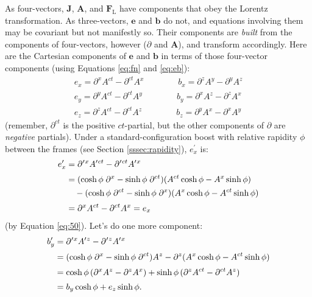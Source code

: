 \documentclass[12pt]{article}
\renewcommand{\vv}[1]{\mathbf{#1}}
\begin{document}
As four-vectors, $\vv J$, $\vv A$, and $\vv F_{\mathrm{L}}$ have components that obey the Lorentz transformation. As three-vectors, $\vv e$ and $\vv b$ do not, and equations involving them may be covariant but not manifestly so. Their components are \emph{built} from the components of four-vectors, however ($\partialup$ and $\vv A$), and transform accordingly. Here are the Cartesian components of $\vv e$ and $\vv b$ in terms of those four-vector components (using Equations \ref{eq:fn} and \ref{eq:eb}):
\begin{equation}\label{eq:ebc}
\begin{aligned}
e_x = \partial^x A^{ct} - \partial^{ct} A^x \qquad \qquad b_x = \partial^z A^y - \partial^y A^z \\
e_y = \partial^y A^{ct} - \partial^{ct} A^y \qquad \qquad b_y = \partial^x A^z - \partial^z A^x \\
e_z = \partial^z A^{ct} - \partial^{ct} A^z \qquad \qquad b_z = \partial^y A^x - \partial^x A^y 
\end{aligned}
\end{equation}
(remember, $\partial^{ct}$ is the positive $ct$-partial, but the other components of $\partialup$ are \emph{negative} partials). Under a standard-configuration boost with relative rapidity $\phi$ between the frames (see Section \ref{sssec:rapidity}), $e^\prime_x$ is:
\begin{equation*}
\begin{split}
e^\prime_x &= \partial^{\mkern.5mu \prime \mkern1mu x} A^{\prime \mkern1mu ct} - \partial^{\mkern.5mu \prime \mkern1mu ct} A^{\prime \mkern1mu x} \\[2pt]
&= (\cosh{\phi} \; \partial^x  - \sinh{\phi} \; \partial^{ct} )(A^{ct} \cosh{\phi}  - A^x \sinh{\phi} ) \\
& \quad - (\cosh{\phi} \; \partial^{ct} -  \sinh{\phi} \; \partial^x )(A^x \cosh{\phi} - A^{ct} \sinh{\phi} ) \\[2pt]
&= \partial^x A^{ct} - \partial^{ct} A^x = e_x
\end{split}
\end{equation*}
(by Equation \ref{eq:50}). Let's do one more component:
\begin{equation*}
\begin{split}
b^\prime_y &= \partial^{\mkern.5mu \prime \mkern1mu x} A^{\prime \mkern1mu z} - \partial^{\mkern.5mu \prime \mkern1mu z} A^{\prime \mkern1mu x} \\[2pt]
&= (\cosh{\phi} \; \partial^x  - \sinh{\phi} \; \partial^{ct} ) A^z - \partial^z (A^x \cosh{\phi} - A^{ct} \sinh{\phi} ) \\[2pt]
&= \cosh{\phi} \, (\partial^x A^z - \partial^z A^x) + \sinh{\phi} \, (\partial^z A^{ct} - \partial^{ct} A^z) \\[2pt]
&= b_y \cosh{\phi} + e_z \sinh{\phi} .
\end{split}
\end{equation*}
\end{document}

